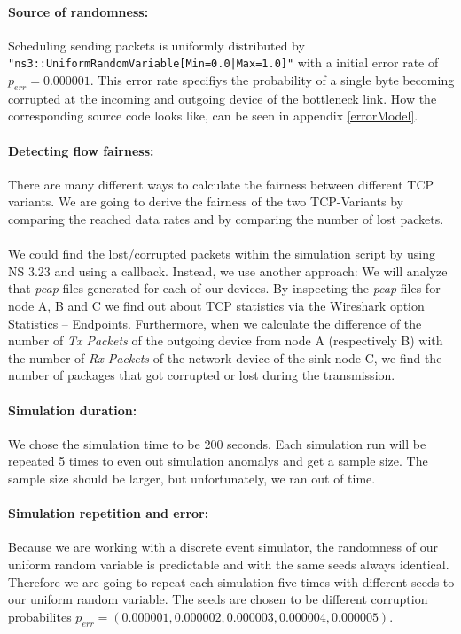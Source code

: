 \documentclass{article}
\begin{document}
\paragraph{Source of randomness:} Scheduling sending packets is uniformly distributed by \texttt{"ns3::UniformRandomVariable[Min=0.0|Max=1.0]"} with a initial error rate of $p_{err} = 0.000001$. This error rate specifiys the probability of a single byte becoming corrupted at the incoming and outgoing device of the bottleneck link. How the corresponding source code looks like, can be seen in appendix \ref{errorModel}.

\paragraph{Detecting flow fairness:} There are many different ways to calculate the fairness between different TCP variants. We are going to derive the fairness of the two TCP-Variants by comparing the reached data rates and by comparing the number of lost packets.\\\\
We could find the lost/corrupted packets within the simulation script by using NS 3.23 and using a callback. Instead, we use another approach: We will analyze that \textit{pcap} files generated for each of our devices. By inspecting the \textit{pcap} files for node A, B and C we find out about TCP statistics via the Wireshark option Statistics -- Endpoints. Furthermore, when we calculate the difference of the number of \textit{Tx Packets} of the outgoing device from node A (respectively B) with the number of \textit{Rx Packets} of the network device of the sink node C, we find the number of packages that got corrupted or lost during the transmission.

\paragraph{Simulation duration:} We chose the simulation time to be 200 seconds. Each simulation run will be repeated 5 times to even out simulation anomalys and get a sample size. The sample size should be larger, but unfortunately, we ran out of time.

\paragraph{Simulation repetition and error:} Because we are working with a discrete event simulator, the randomness of our uniform random variable is predictable and with the same seeds always identical. Therefore we are going to repeat each simulation five times with different seeds to our uniform random variable. The seeds are chosen to be different corruption probabilites $p_{err} = (0.000001, 0.000002, 0.000003, 0.000004, 0.000005)$.
\end{document}
